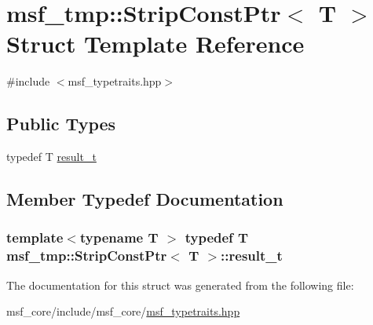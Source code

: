 \hypertarget{structmsf__tmp_1_1StripConstPtr}{\section{msf\-\_\-tmp\-:\-:Strip\-Const\-Ptr$<$ T $>$ Struct Template Reference}
\label{structmsf__tmp_1_1StripConstPtr}
}


{\ttfamily \#include $<$msf\-\_\-typetraits.\-hpp$>$}

\subsection*{Public Types}
\begin{DoxyCompactItemize}
\item 
typedef T \hyperlink{structmsf__tmp_1_1StripConstPtr_aaa6063832bdfda3b18f09e719a9f0626}{result\-\_\-t}
\end{DoxyCompactItemize}


\subsection{Member Typedef Documentation}
\hypertarget{structmsf__tmp_1_1StripConstPtr_aaa6063832bdfda3b18f09e719a9f0626}{
\subsubsection[{result\-\_\-t}]{\setlength{\rightskip}{0pt plus 5cm}template$<$typename T $>$ typedef T {\bf msf\-\_\-tmp\-::\-Strip\-Const\-Ptr}$<$ T $>$\-::{\bf result\-\_\-t}}}\label{structmsf__tmp_1_1StripConstPtr_aaa6063832bdfda3b18f09e719a9f0626}


The documentation for this struct was generated from the following file\-:\begin{DoxyCompactItemize}
\item 
msf\-\_\-core/include/msf\-\_\-core/\hyperlink{msf__typetraits_8hpp}{msf\-\_\-typetraits.\-hpp}\end{DoxyCompactItemize}
